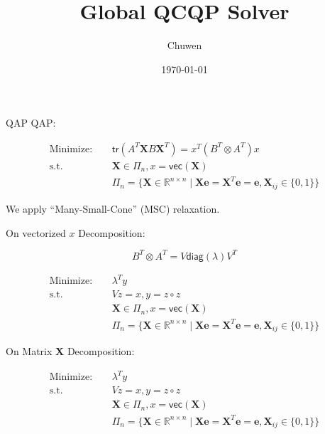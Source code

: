 
\usepackage{subfig}
\usepackage[style=verbose]{biblatex}
\usepackage{bm}
\title{Global QCQP Solver}
\author{Chuwen}
\date{\today}




\fontsize{8pt}{11.2}\selectfont
\frame{\titlepage}



\begin{frame}{QAP}
  QAP:

  \begin{align*}
    \mathrm{Minimize:}\quad & \mathsf{tr}(A^T \bm X B \bm X^T)  = x^T(B^T\otimes A^T) x \\
    \mathrm{s.t.} \quad     & \bm X  \in \Pi_{n}, x = \mathsf{vec}(\bm X)               \\
                            & \Pi_{n}=\{\bm X \in \mathbb{R}^{n \times n} \mid
    \bm X \mathbf{e}= \bm X^T \mathbf{e}=\mathbf{e}, \bm X_{i j} \in\{0,1\}\}
  \end{align*}

  We apply ``Many-Small-Cone'' (MSC) relaxation.
\end{frame}

\begin{frame}{On vectorized \(x\)}
  Decomposition:

  \begin{equation}
    B^T\otimes A^T = V\mathsf{diag}(\lambda)V^T
  \end{equation}

  \begin{align*}
    \mathrm{Minimize:}\quad & \lambda^Ty                                       \\
    \mathrm{s.t.} \quad     & Vz = x, y = z\circ z                             \\
                            & \bm X  \in \Pi_{n}, x = \mathsf{vec}(\bm X)      \\
                            & \Pi_{n}=\{\bm X \in \mathbb{R}^{n \times n} \mid
    \bm X \mathbf{e}= \bm X^T \mathbf{e}=\mathbf{e}, \bm X_{i j} \in\{0,1\}\}
  \end{align*}

\end{frame}



\begin{frame}{On Matrix \(\bm X\)}
  Decomposition:

  \begin{align*}
    \mathrm{Minimize:}\quad & \lambda^Ty                                       \\
    \mathrm{s.t.} \quad     & Vz = x, y = z\circ z                             \\
                            & \bm X  \in \Pi_{n}, x = \mathsf{vec}(\bm X)      \\
                            & \Pi_{n}=\{\bm X \in \mathbb{R}^{n \times n} \mid
    \bm X \mathbf{e}= \bm X^T \mathbf{e}=\mathbf{e}, \bm X_{i j} \in\{0,1\}\}
  \end{align*}

\end{frame}



